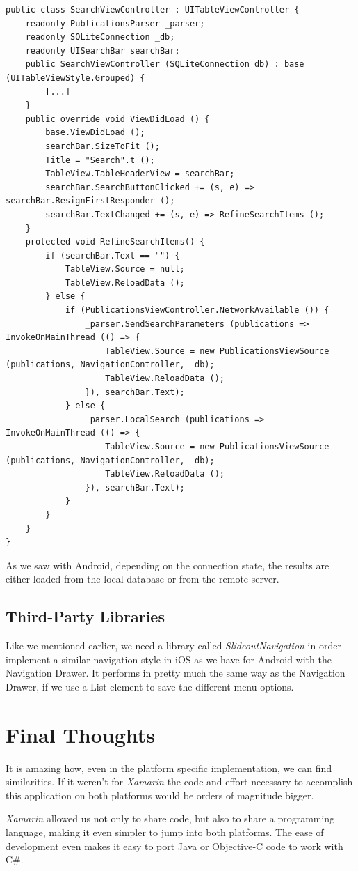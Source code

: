 \begin{lstlisting}[frame=lt,caption=SearchViewController.cs, label={list:ios_search}]
public class SearchViewController : UITableViewController {
	readonly PublicationsParser _parser;
	readonly SQLiteConnection _db;
	readonly UISearchBar searchBar;
	public SearchViewController (SQLiteConnection db) : base (UITableViewStyle.Grouped) {
		[...]
	}
	public override void ViewDidLoad ()	{
		base.ViewDidLoad ();
		searchBar.SizeToFit ();
		Title = "Search".t ();
		TableView.TableHeaderView = searchBar;
		searchBar.SearchButtonClicked += (s, e) => searchBar.ResignFirstResponder ();
		searchBar.TextChanged += (s, e) => RefineSearchItems ();
	}
	protected void RefineSearchItems() {
		if (searchBar.Text == "") {
			TableView.Source = null;
			TableView.ReloadData ();
		} else {
			if (PublicationsViewController.NetworkAvailable ()) {
				_parser.SendSearchParameters (publications => InvokeOnMainThread (() => {
					TableView.Source = new PublicationsViewSource (publications, NavigationController, _db);
					TableView.ReloadData ();
				}), searchBar.Text);
			} else {
				_parser.LocalSearch (publications => InvokeOnMainThread (() => {
					TableView.Source = new PublicationsViewSource (publications, NavigationController, _db);
					TableView.ReloadData ();
				}), searchBar.Text);
			}			
		}			
	}
}
\end{lstlisting}

As we saw with Android, depending on the connection state, the results are either loaded from the local database or from the remote server.

\subsection{Third-Party Libraries}

Like we mentioned earlier, we need a library called \textit{SlideoutNavigation} in order implement a similar navigation style in iOS as we have for Android with the Navigation Drawer. It performs in pretty much the same way as the Navigation Drawer, if we use a List element to save the different menu options.

\section{Final Thoughts}
It is amazing how, even in the platform specific implementation, we can find similarities. If it weren't for \textit{Xamarin} the code and effort necessary to accomplish this application on both platforms would be orders of magnitude bigger.

\textit{Xamarin} allowed us not only to share code, but also to share a programming language, making it even simpler to jump into both platforms. The ease of development even makes it easy to port Java or Objective-C code to work with C\#. 